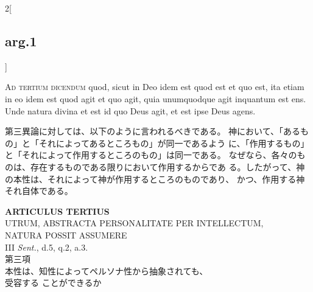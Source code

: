 \documentclass[paper=a4paper,fontsize=10pt,jafontsize=9pt,titlepage]{jlreq}
\begin{document}
\begin{paracol}{2}[\subsection{arg.1}]
\switchcolumn*[\subsection{ad.3}]

{\scshape Ad tertium dicendum} quod, sicut in Deo idem est quod est et quo est, ita
 etiam in eo idem est quod agit et quo agit, quia unumquodque agit
 inquantum est ens. Unde natura divina et est id quo Deus agit, et est
 ipse Deus agens.

\switchcolumn

第三異論に対しては、以下のように言われるべきである。
神において、「あるもの」と「それによってあるところもの」が同一であるよう
 に、「作用するもの」と「それによって作用するところのもの」は同一である。
 なぜなら、各々のものは、存在するものである限りにおいて作用するからであ
 る。したがって、神の本性は、それによって神が作用するところのものであり、
 かつ、作用する神それ自体である。

\end{paracol}
\newpage
{}
{}
\setcounter{section}{3}
\setcounter{subsection}{0}




\begin{center}
 {\Large {\bfseries ARTICULUS TERTIUS}}\\
 {\large UTRUM, ABSTRACTA PERSONALITATE PER INTELLECTUM,\\ NATURA POSSIT ASSUMERE}\\
 {\footnotesize III {\itshape Sent.}, d.5, q.2, a.3.}\\
 {\Large 第三項\\本性は、知性によってペルソナ性から抽象されても、\\受容する
 ことができるか}
\end{center}
\end{document}

